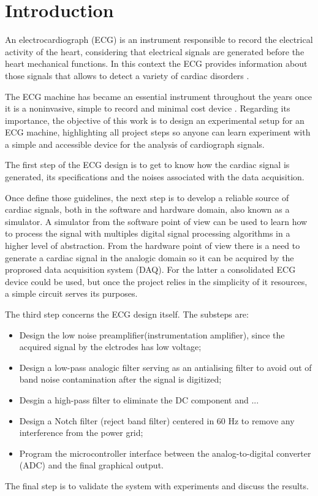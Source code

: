 \section{Introduction}

An electrocardiograph (ECG) is an instrument responsible to record the electrical activity of the heart, considering that electrical signals are generated before the heart mechanical functions. In this context the ECG provides information about those signals that allows to detect a variety of cardiac disorders \cite{khandpur1987handbook}.

The ECG machine has became an essential instrument throughout the years once it is a noninvasive, simple to record and minimal cost device \cite{barold2003willem}. Regarding its importance, the objective of this work is to design an experimental setup for an ECG machine, highlighting all project steps so anyone can learn experiment with a simple and accessible device for the analysis of cardiograph signals.

The first step of the ECG design is to get to know how the cardiac signal is generated, its specifications and the noises associated with the data acquisition.

Once define those guidelines, the next step is to develop a reliable source of cardiac signals, both in the software and hardware domain, also known as a simulator. A simulator from the software point of view can be used to learn how to process the signal with multiples digital signal processing algorithms in a higher level of abstraction. From the hardware point of view there is a need to generate a cardiac signal in the analogic domain so it can be acquired by the proprosed data acquisition system (DAQ). For the latter a consolidated ECG device could be used, but once the project relies in the simplicity of it resources, a simple circuit serves its purposes.

The third step concerns the ECG design itself. The substeps are:

\begin{itemize}
    \item Design the low noise preamplifier(instrumentation amplifier), since the acquired signal by the elctrodes has low voltage;
    \item Design a low-pass analogic filter serving as an antialising filter to avoid out of band noise contamination after the signal is digitized;
    \item Desgin a high-pass filter to eliminate the DC component and ...
    \item Design a Notch filter (reject band filter) centered in 60 Hz to remove any interference from the power grid;
    \item Program the microcontroller interface between the analog-to-digital converter (ADC) and the final graphical output.
\end{itemize}

The final step is to validate the system with experiments and discuss the results.

\pagebreak